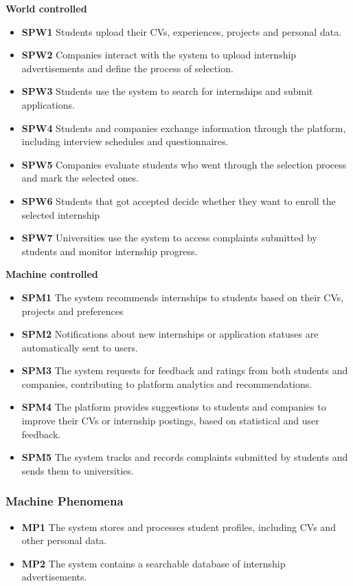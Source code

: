 \textbf{World controlled}
\begin{itemize}
    \item \textbf{SPW1} Students upload their CVs, experiences, projects and personal data.
    \item \textbf{SPW2} Companies interact with the system to upload internship advertisements and define the process of selection.
    \item \textbf{SPW3} Students use the system to search for internships and submit applications.
    \item \textbf{SPW4} Students and companies exchange information through the platform, including interview schedules and questionnaires.
    \item \textbf{SPW5} Companies evaluate students who went through the selection process and mark the selected ones.
    \item \textbf{SPW6} Students that got accepted decide whether they want to enroll the selected internship
    \item \textbf{SPW7} Universities use the system to access complaints submitted by students and monitor internship progress.
    
\end{itemize}
\textbf{Machine controlled}
\begin{itemize}    
    \item \textbf{SPM1} The system recommends internships to students based on their CVs, projects and preferences
    \item \textbf{SPM2} Notifications about new internships or application statuses are automatically sent to users.
    \item \textbf{SPM3} The system requests for feedback and ratings from both students and companies, contributing to platform analytics and recommendations.
    \item \textbf{SPM4} The platform provides suggestions to students and companies to improve their CVs or internship postings, based on statistical and user feedback.
    \item \textbf{SPM5} The system tracks and records complaints submitted by students and sends them to universities.
\end{itemize}

\subsubsection{Machine Phenomena}
\begin{itemize}
    \item \textbf{MP1} The system stores and processes student profiles, including CVs and other personal data.
    \item \textbf{MP2} The system contains a searchable database of internship advertisements.
\end{itemize}


